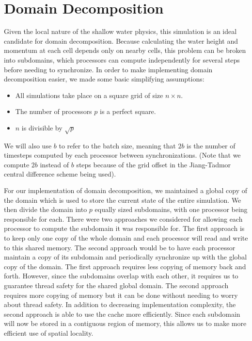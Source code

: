 \section{Domain Decomposition}

Given the local nature of the shallow water physics, this simulation is an ideal candidate for domain decomposition. Because calculating the water height and momentum at each cell depends only on nearby cells, this problem can be broken into subdomains, which processors can compute independently for several steps before needing to synchronize. In order to make implementing domain decomposition easier, we made some basic simplifying assumptions:

\begin{itemize}
	\item All simulations take place on a square grid of size $n \times n$.
	\item The number of processors $p$ is a perfect square.
	\item $n$ is divisible by $\sqrt{p}$
\end{itemize}

We will also use $b$ to refer to the batch size, meaning that $2b$ is the number of timesteps computed by each processor between synchronizations. (Note that we compute $2b$ instead of $b$ steps because of the grid offset in the Jiang-Tadmor central difference scheme being used).

For our implementation of domain decomposition, we maintained a global copy of the domain which is used to store the current state of the entire simulation. We then divide the domain into $p$ equally sized subdomains, with one processor being responsible for each. There were two approaches we considered for allowing each processor to compute the subdomain it was responsible for. The first approach is to keep only one copy of the whole domain and each processor will read and write to this shared memory. The second approach would be to have each processor maintain a copy of its subdomain and periodically synchronize up with the global copy of the domain. The first approach requires less copying of memory back and forth. However, since the subdomains overlap with each other, it requires us to guarantee thread safety for the shared global domain. The second approach requires more copying of memory but it can be done without needing to worry about thread safety. In addition to decreasing implementation complexity, the second approach is able to use the cache more efficiently. Since each subdomain will now be stored in a contiguous region of memory, this allows us to make more efficient use of spatial locality. 

